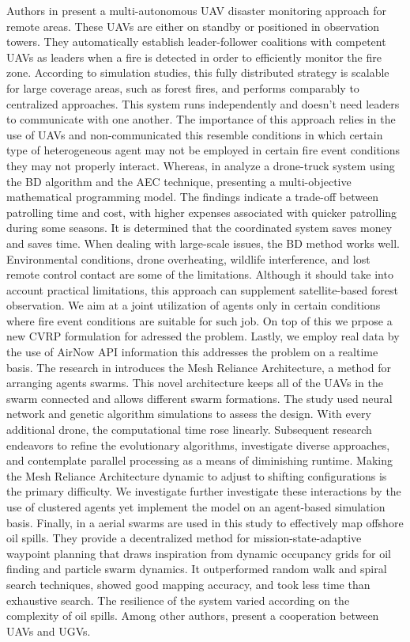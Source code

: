 \documentclass[preprint,review, 11pt,3p,authoryear]{elsarticle}
\begin{document}
Authors in \cite{afghah_wildfire_2019} present a multi-autonomous UAV disaster monitoring approach for remote areas. These UAVs are either on standby or positioned in observation towers. They automatically establish leader-follower coalitions with competent UAVs as leaders when a fire is detected in order to efficiently monitor the fire zone. According to simulation studies, this fully distributed strategy is scalable for large coverage areas, such as forest fires, and performs comparably to centralized approaches. This system runs independently and doesn't need leaders to communicate with one another.
The importance of this approach relies in the use of UAVs and non-communicated this resemble conditions in which certain type of heterogeneous agent may not be employed in certain fire event conditions they may not properly interact.
Whereas, in \cite{momeni_coordinated_2022} analyze a drone-truck system using the BD algorithm and the AEC technique, presenting a multi-objective mathematical programming model. The findings indicate a trade-off between patrolling time and cost, with higher expenses associated with quicker patrolling during some seasons. It is determined that the coordinated system saves money and saves time. When dealing with large-scale issues, the BD method works well. Environmental conditions, drone overheating, wildlife interference, and lost remote control contact are some of the limitations. Although it should take into account practical limitations, this approach can supplement satellite-based forest observation.
We aim at a joint utilization of agents only in certain conditions where fire event conditions are suitable for such job. On top of this we prpose a new CVRP formulation for adressed the problem. Lastly, we employ real data by the use of AirNow API information this addresses the problem on a realtime basis.
The research in \cite{Ruetten} introduces the Mesh Reliance Architecture, a method for arranging agents swarms. This novel architecture keeps all of the UAVs in the swarm connected and allows different swarm formations. The study used neural network and genetic algorithm simulations to assess the design. With every additional drone, the computational time rose linearly. Subsequent research endeavors to refine the evolutionary algorithms, investigate diverse approaches, and contemplate parallel processing as a means of diminishing runtime. Making the Mesh Reliance Architecture dynamic to adjust to shifting configurations is the primary difficulty. We investigate further investigate these interactions by the use of clustered agents yet implement the model on an agent-based simulation basis.
Finally, in \cite{odonkor_distributed_2019} a aerial swarms are used in this study to effectively map offshore oil spills. They provide a decentralized method for mission-state-adaptive waypoint planning that draws inspiration from dynamic occupancy grids for oil finding and particle swarm dynamics. It outperformed random walk and spiral search techniques, showed good mapping accuracy, and took less time than exhaustive search. The resilience of the system varied according on the complexity of oil spills.
Among other authors, \cite{phan_cooperative_2008} present a cooperation between UAVs and UGVs.
\end{document}
